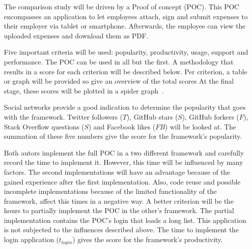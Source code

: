 \documentclass[a4paper]{artikel3}
\newcommand{\setspace}[0]{\vspace{2mm}}
\renewcommand{\paragraph}[1]{\setspace \noindent {\bf #1}  }
\begin{document}
The comparison study will be driven by a Proof of concept (POC).  
This POC encompasses an application to let employees attach, sign and submit expenses to their employer via tablet or smartphone.
Afterwards, the employee can view the uploaded expenses and download them as PDF.

Five important criteria will be used:  popularity,  productivity,  usage,  support and performance. 
The POC can be used in all but the first.   
A methodology that results in a score for each criterion will be described below.  
Per criterion,  a table or graph will be provided so give an overview of the total scores
At the final stage,  these scores will be plotted in a spider graph~\cite{Few2005}.   

\paragraph{Popularity}
Social networks provide a good indication to determine the popularity that goes with the framework.  
Twitter followers ($T$),  GitHub stars ($S$),  GitHub forkers ($F$),  Stack Overflow questions ($S$) and Facebook likes ($FB$) will be looked at.
The summation of these five numbers give the score for the framework's popularity.  


\paragraph{Productivity}
Both autors implement the full POC in a two different framework and carefully record the time to implement it.  
However,  this time will be influenced by many factors.
The second implementations will have an advantage because of the gained experience after the first implementation.
Also,  code reuse and possible incomplete implementations because of the limited functionality of the framework, affect this times in a negative way.
A better criterion will be the hours to partially implement the POC in the other's framework.  
The partial implementation contains the POC's login that loads a long list.%
This application is not subjected to the influences described above. %
The time to implement the login application ($t_{login}$) gives the score for the framework's productivity. 
\end{document}
